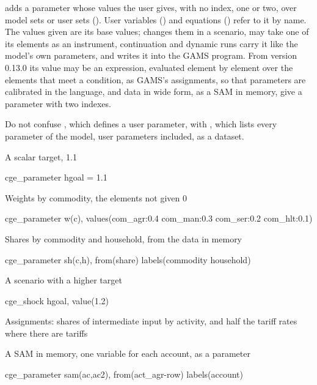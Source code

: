 

 adds a parameter whose values the user gives, with no
index, one or two, over model sets or user sets (). User
variables () and equations () refer
to it by name. The values given are its base values; 
changes them in a scenario,  may take one of its elements
as an instrument, continuation and dynamic runs carry it like the model's own
parameters, and  writes it into the GAMS program. From
version 0.13.0 its value may be an expression, evaluated element by element
over the elements that meet a condition, as GAMS's assignments, so that
parameters are calibrated in the language, and data in wide form, as a SAM
in memory, give a parameter with two indexes.

Do not confuse , which defines a user parameter, with
, which lists every parameter of the model, user
parameters included, as a dataset.


A scalar target, 1.1
\begin{stcode}
cge_parameter hgoal = 1.1
\end{stcode}
Weights by commodity, the elements not given 0
\begin{stcode}
cge_parameter w(c), values(com_agr:0.4 com_man:0.3 com_ser:0.2 com_hlt:0.1)
\end{stcode}
Shares by commodity and household, from the data in memory
\begin{stcode}
cge_parameter sh(c,h), from(share) labels(commodity household)
\end{stcode}
A scenario with a higher target
\begin{stcode}
cge_shock hgoal, value(1.2)
\end{stcode}
Assignments: shares of intermediate input by activity, and half the tariff
rates where there are tariffs
A SAM in memory, one variable for each account, as a parameter
\begin{stcode}
cge_parameter sam(ac,ac2), from(act_agr-row) labels(account)
\end{stcode}

